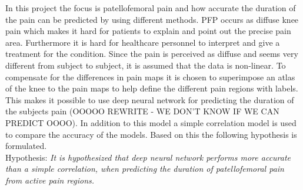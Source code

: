 
In this project the focus is patellofemoral pain and how accurate the duration of the pain can be predicted by using different methods. PFP occurs as diffuse knee pain which makes it hard for patients to explain and point out the precise pain area. Furthermore it is hard for healthcare personnel to interpret and give a treatment for the condition. Since the pain is perceived as diffuse and seems very different from subject to subject, it is assumed that the data is non-linear. To compensate for the differences in pain maps it is chosen to superimpose an atlas of the knee to the pain maps to help define the different pain regions with labels. This makes it possible to use deep neural network for predicting the duration of the subjects pain (OOOOO REWRITE - WE DON'T KNOW IF WE CAN PREDICT OOOO). In addition to this model a simple correlation model is used to compare the accuracy of the models. Based on this the following hypothesis is formulated.\\

\noindent
Hypothesis: \textit{It is hypothesized that deep neural network performs more accurate than a simple correlation, when predicting the duration of patellofemoral pain from active pain regions.}
